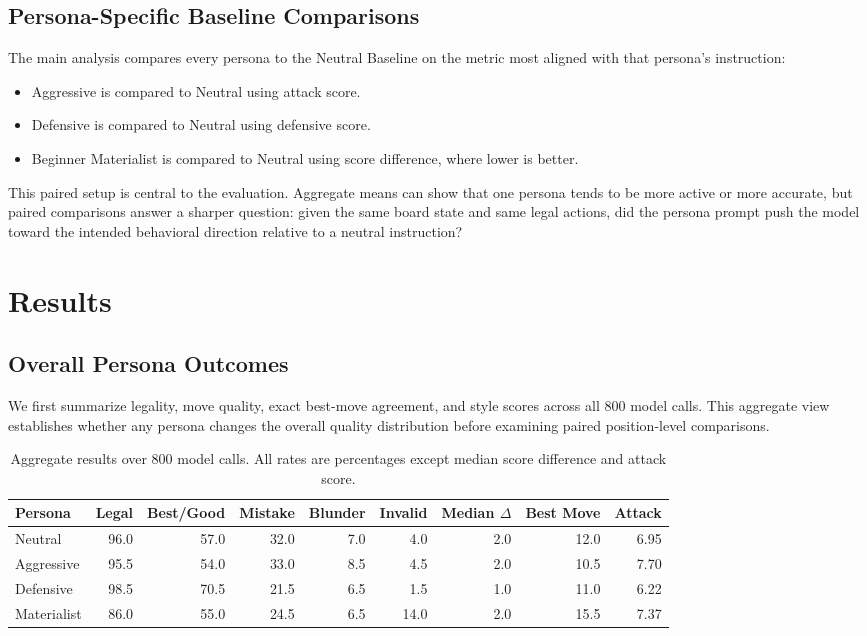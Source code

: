 \documentclass[10pt]{article}
\begin{document}
\subsection{Persona-Specific Baseline Comparisons}

The main analysis compares every persona to the Neutral Baseline on the metric most aligned with that persona's instruction:

\begin{itemize}
    \item Aggressive is compared to Neutral using attack score.
    \item Defensive is compared to Neutral using defensive score.
    \item Beginner Materialist is compared to Neutral using score difference, where lower is better.
\end{itemize}

This paired setup is central to the evaluation. Aggregate means can show that one persona tends to be more active or more accurate, but paired comparisons answer a sharper question: given the same board state and same legal actions, did the persona prompt push the model toward the intended behavioral direction relative to a neutral instruction?

\section{Results}

\subsection{Overall Persona Outcomes}

We first summarize legality, move quality, exact best-move agreement, and style scores across all 800 model calls. This aggregate view establishes whether any persona changes the overall quality distribution before examining paired position-level comparisons.

\begin{table}[!htbp]
\centering
\small
\begin{tabular}{lrrrrrrrr}
\toprule
Persona & Legal & Best/Good & Mistake & Blunder & Invalid & Median $\Delta$ & Best Move & Attack\\
\midrule
Neutral & 96.0 & 57.0 & 32.0 & 7.0 & 4.0 & 2.0 & 12.0 & 6.95\\
Aggressive & 95.5 & 54.0 & 33.0 & 8.5 & 4.5 & 2.0 & 10.5 & 7.70\\
Defensive & 98.5 & 70.5 & 21.5 & 6.5 & 1.5 & 1.0 & 11.0 & 6.22\\
Materialist & 86.0 & 55.0 & 24.5 & 6.5 & 14.0 & 2.0 & 15.5 & 7.37\\
\bottomrule
\end{tabular}
\caption{Aggregate results over 800 model calls. All rates are percentages except median score difference and attack score.}
\label{tab:aggregate}
\end{table}
\end{document}
